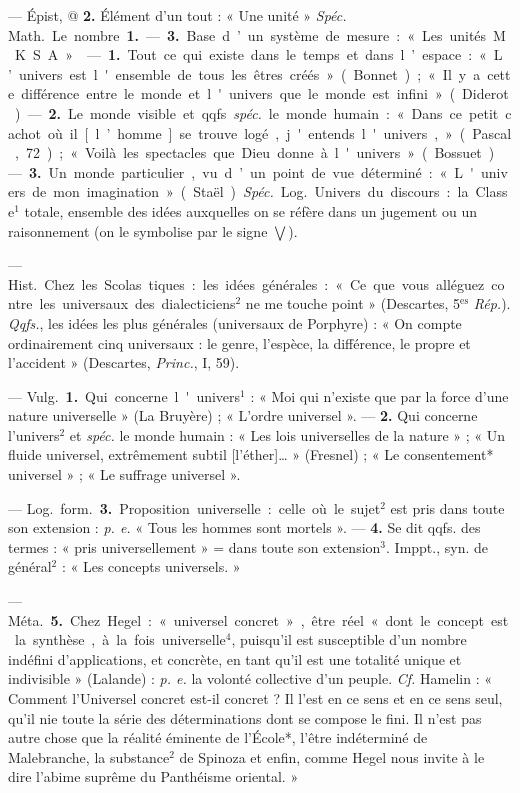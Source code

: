 \begin{itemize}[leftmargin=1cm, label=, itemsep=1pt]
— Épist, @ {\bf 2.} Élément d’un tout :
« Une unité » {\it Spéc.} \si{Math.} Le
nombre {\bf 1.} — {\bf 3.} Base d’un système
de mesure : « Les unités M. K. S. A. »

 — {\bf 1.} Tout ce qui existe dans
le temps et dans l’espace : « L’univers est l'ensemble de tous les êtres
créés » (Bonnet) ; « Il y a cette différence entre le monde et l'univers
que le monde est infini » (Diderot).
— {\bf 2.} Le monde visible et qqfs.
{\it spéc.} le monde humain : « Dans ce
petit cachot où il [l’homme] se
trouve logé, j'entends l'univers,... »
(Pascal, 72) ; « Voilà les spectacles
que Dieu donne à l'univers » (Bossuet). — {\bf 3.} Un monde particulier,
vu d’un point de vue déterminé :
« L'univers de mon imagination »
(Staël). {\it Spéc.} \si{Log.} Univers du discours : la Classe$^1$ totale, ensemble
des idées auxquelles on se réfère
dans un jugement ou un raisonnement (on le symbolise par le signe $\bigvee$).

 — \si{Hist.} Chez les Scolas
tiques : les idées générales : « Ce que
vous alléguez contre les universaux
des dialecticiens$^2$ ne me touche
point » (Descartes, 5$^\text{es}$ {\it Rép.}). {\it Qqfs.},
les idées les plus générales (universaux de Porphyre) : « On compte
ordinairement cinq universaux : le
genre, l'espèce, la différence, le
propre et l'accident » (Descartes,
{\it Princ.}, I, 59).

 — \si{Vulg.} {\bf 1.} Qui concerne
l'univers$^1$ : « Moi qui n'existe que
par la force d’une nature universelle » (La Bruyère) ; « L'ordre universel ». — {\bf 2.} Qui concerne l’univers$^2$ et {\it spéc.} le monde humain :
« Les lois universelles de la nature » ;
« Un fluide universel, extrêmement
subtil [l'éther]… » (Fresnel) ; « Le
consentement* universel » ; « Le
suffrage universel ».

— \si{Log.} \si{form.} {\bf 3.} Proposition universelle : celle où le sujet$^2$ est pris
dans toute son extension : {\it p. e.}
« Tous les hommes sont mortels ». —
 {\bf 4.} Se dit qqfs. des termes : « pris
universellement » = dans toute son
extension$^3$. Imppt., syn. de général$^2$ :
« Les concepts universels. »

— \si{Méta.} {\bf 5.} Chez Hegel : « universel concret », être réel « dont le
concept est la synthèse, à la fois
universelle$^4$, puisqu'il est susceptible d’un nombre indéfini d'applications, et concrète, en tant qu'il
est une totalité unique et indivisible » (Lalande) : {\it p. e.} la volonté
collective d’un peuple. {\it Cf.} Hamelin :
« Comment l'Universel concret est-il
concret ? Il l'est en ce sens et en ce
sens seul, qu'il nie toute la série des
déterminations dont se compose le
fini. Il n’est pas autre chose que la
réalité éminente de l’École*, l'être
indéterminé de Malebranche, la
substance$^2$ de Spinoza et enfin,
comme Hegel nous invite à le dire
l’abime suprême du Panthéisme
oriental. »


\end{itemize}
